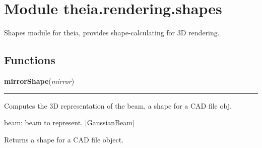 %
%
%


\section{Module theia.rendering.shapes}

    \label{theia:rendering:shapes}
Shapes module for theia, provides shape-calculating for 3D rendering.



  \subsection{Functions}

    \label{theia:rendering:shapes:mirrorShape}

    \vspace{0.5ex}

\hspace{.8\funcindent}\begin{boxedminipage}{\funcwidth}

    \raggedright \textbf{mirrorShape}(\textit{mirror})

    \vspace{-1.5ex}

    \rule{\textwidth}{0.5\fboxrule}
\setlength{\parskip}{2ex}
    Computes the 3D representation of the beam, a shape for a CAD file obj.

    beam: beam to represent. [GaussianBeam]

    Returns a shape for a CAD file object.

\setlength{\parskip}{1ex}
    \end{boxedminipage}

